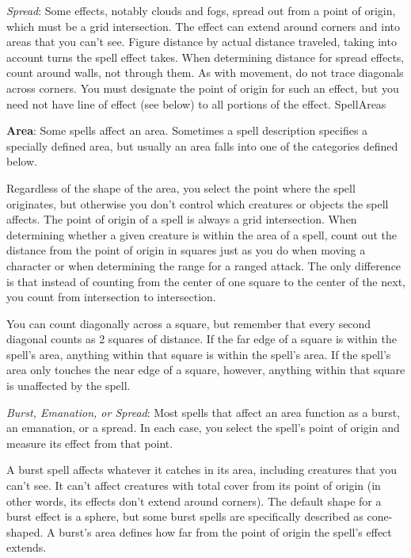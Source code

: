 \textit{Spread}: Some effects, notably clouds and fogs, spread out from a point of origin, which must be a grid intersection. The effect can extend around corners and into areas that you can't see. Figure distance by actual distance traveled, taking into account turns the spell effect takes. When determining distance for spread effects, count around walls, not through them. As with movement, do not trace diagonals across corners. You must designate the point of origin for such an effect, but you need not have line of effect (see below) to all portions of the effect.
SpellAreas

				
\textbf{Area}: Some spells affect an area. Sometimes a spell description specifies a specially defined area, but usually an area falls into one of the categories defined below.
				
Regardless of the shape of the area, you select the point where the spell originates, but otherwise you don't control which creatures or objects the spell affects. The point of origin of a spell is always a grid intersection. When determining whether a given creature is within the area of a spell, count out the distance from the point of origin in squares just as you do when moving a character or when determining the range for a ranged attack. The only difference is that instead of counting from the center of one square to the center of the next, you count from intersection to intersection.
				
You can count diagonally across a square, but remember that every second diagonal counts as 2 squares of distance. If the far edge of a square is within the spell's area, anything within that square is within the spell's area. If the spell's area only touches the near edge of a square, however, anything within that square is unaffected by the spell.
				
\textit{Burst, Emanation, or Spread}: Most spells that affect an area function as a burst, an emanation, or a spread. In each case, you select the spell's point of origin and measure its effect from that point.
				
A burst spell affects whatever it catches in its area, including creatures that you can't see. It can't affect creatures with total cover from its point of origin (in other words, its effects don't extend around corners). The default shape for a burst effect is a sphere, but some burst spells are specifically described as cone-shaped. A burst's area defines how far from the point of origin the spell's effect extends.
				
